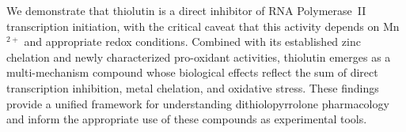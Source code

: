 \documentclass[11pt]{article}
\begin{document}
We demonstrate that thiolutin is a direct inhibitor of RNA Polymerase~II transcription initiation, with the critical caveat that this activity depends on Mn$^{2+}$ and appropriate redox conditions. Combined with its established zinc chelation and newly characterized pro-oxidant activities, thiolutin emerges as a multi-mechanism compound whose biological effects reflect the sum of direct transcription inhibition, metal chelation, and oxidative stress. These findings provide a unified framework for understanding dithiolopyrrolone pharmacology and inform the appropriate use of these compounds as experimental tools.



\end{document}
